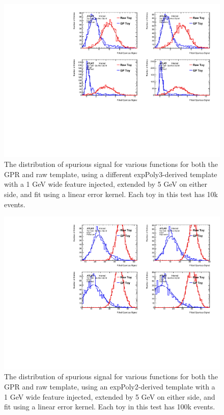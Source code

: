 \begin{figure} 
\begin{center}
  \includegraphics[width=\textwidth]{figures/background/gpr/validation/linear/ToyTest_FitSigVals_highpT_10k_Sig_1s}   
\caption{The distribution of spurious signal for various functions for both the GPR and raw template, using a different expPoly3-derived template with a 1 GeV wide feature injected, extended by 5 GeV on either side, and fit using a linear error kernel. Each toy in this test has 10k events.}
\label{fig:linearkernel_highpt_10k_Sig_1s}
\end{center}
\end{figure}

\begin{figure} 
\begin{center}
  \includegraphics[width=\textwidth]{figures/background/gpr/validation/linear/ToyTest_FitSigVals_lowpT_100k_Sig_1s}   
\caption{The distribution of spurious signal for various functions for both the GPR and raw template, using an expPoly2-derived template with a 1 GeV wide feature injected, extended by 5 GeV on either side, and fit using a linear error kernel. Each toy in this test has 100k events.}
\label{fig:linearkernel_lowpt_100k_Sig_1s}
\end{center}
\end{figure}

